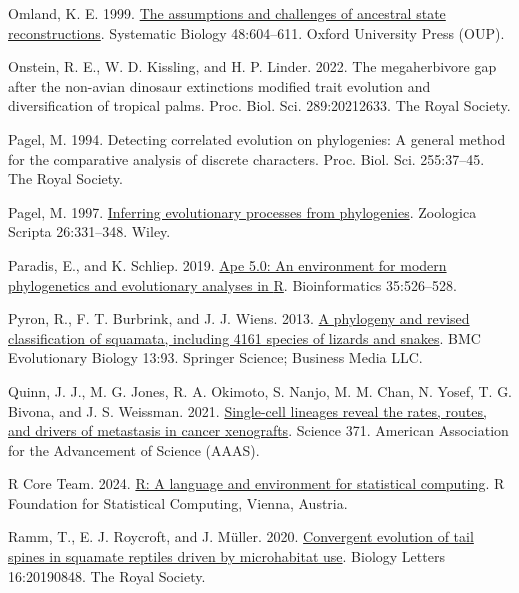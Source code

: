 \documentclass{article}
\newlength{\cslhangindent}
\newenvironment{CSLReferences}[2] %
 {\begin{list}{}{%
  \setlength{\itemindent}{0pt}
  \setlength{\leftmargin}{0pt}
  \setlength{\parsep}{0pt}
  \ifodd #1
   \setlength{\leftmargin}{\cslhangindent}
   \setlength{\itemindent}{-1\cslhangindent}
  \fi
  \setlength{\itemsep}{#2\baselineskip}}}
 {\end{list}}
\begin{document}
\begin{CSLReferences}{1}{0}
Omland, K. E. 1999. \href{https://doi.org/10.1080/106351599260175}{The assumptions and challenges of ancestral state reconstructions}. Systematic Biology 48:604--611. Oxford University Press (OUP).

Onstein, R. E., W. D. Kissling, and H. P. Linder. 2022. The megaherbivore gap after the non-avian dinosaur extinctions modified trait evolution and diversification of tropical palms. Proc. Biol. Sci. 289:20212633. The Royal Society.

Pagel, M. 1994. Detecting correlated evolution on phylogenies: A general method for the comparative analysis of discrete characters. Proc. Biol. Sci. 255:37--45. The Royal Society.

Pagel, M. 1997. \href{https://doi.org/10.1111/j.1463-6409.1997.tb00423.x}{Inferring evolutionary processes from phylogenies}. Zoologica Scripta 26:331--348. Wiley.

Paradis, E., and K. Schliep. 2019. \href{https://doi.org/10.1093/bioinformatics/bty633}{Ape 5.0: An environment for modern phylogenetics and evolutionary analyses in {R}}. Bioinformatics 35:526--528.

Pyron, R., F. T. Burbrink, and J. J. Wiens. 2013. \href{https://doi.org/10.1186/1471-2148-13-93}{A phylogeny and revised classification of squamata, including 4161 species of lizards and snakes}. BMC Evolutionary Biology 13:93. Springer Science; Business Media LLC.

Quinn, J. J., M. G. Jones, R. A. Okimoto, S. Nanjo, M. M. Chan, N. Yosef, T. G. Bivona, and J. S. Weissman. 2021. \href{https://doi.org/10.1126/science.abc1944}{Single-cell lineages reveal the rates, routes, and drivers of metastasis in cancer xenografts}. Science 371. American Association for the Advancement of Science (AAAS).

R Core Team. 2024. \href{https://www.R-project.org/}{R: A language and environment for statistical computing}. R Foundation for Statistical Computing, Vienna, Austria.

Ramm, T., E. J. Roycroft, and J. Müller. 2020. \href{https://doi.org/10.1098/rsbl.2019.0848}{Convergent evolution of tail spines in squamate reptiles driven by microhabitat use}. Biology Letters 16:20190848. The Royal Society.


\end{CSLReferences}
\end{document}
